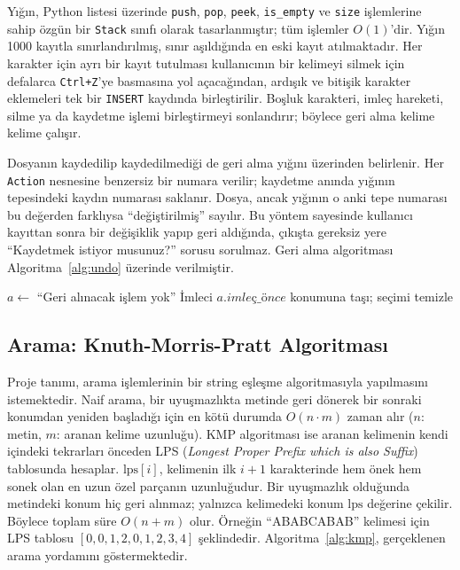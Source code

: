 \documentclass[conference,a4paper]{IEEEtran}
\newcommand{\kod}[1]{\texttt{#1}}
\begin{document}
Yığın, Python listesi üzerinde \kod{push}, \kod{pop}, \kod{peek}, \kod{is\_empty} ve \kod{size} işlemlerine sahip özgün bir \kod{Stack} sınıfı olarak tasarlanmıştır; tüm işlemler $O(1)$'dir. Yığın 1000 kayıtla sınırlandırılmış, sınır aşıldığında en eski kayıt atılmaktadır. Her karakter için ayrı bir kayıt tutulması kullanıcının bir kelimeyi silmek için defalarca \kod{Ctrl+Z}'ye basmasına yol açacağından, ardışık ve bitişik karakter eklemeleri tek bir \kod{INSERT} kaydında birleştirilir. Boşluk karakteri, imleç hareketi, silme ya da kaydetme işlemi birleştirmeyi sonlandırır; böylece geri alma kelime kelime çalışır.

Dosyanın kaydedilip kaydedilmediği de geri alma yığını üzerinden belirlenir. Her \kod{Action} nesnesine benzersiz bir numara verilir; kaydetme anında yığının tepesindeki kaydın numarası saklanır. Dosya, ancak yığının o anki tepe numarası bu değerden farklıysa ``değiştirilmiş'' sayılır. Bu yöntem sayesinde kullanıcı kayıttan sonra bir değişiklik yapıp geri aldığında, çıkışta gereksiz yere ``Kaydetmek istiyor musunuz?'' sorusu sorulmaz. Geri alma algoritması Algoritma~\ref{alg:undo} üzerinde verilmiştir.

\begin{algorithm}[t]
\caption{Geri Alma}
\label{alg:undo}
\begin{algorithmic}[1]
  \State $a \gets$ 
   \State \Return ``Geri alınacak işlem yok''
  \EndIf
  \State {}
  \State İmleci $a.\mathit{imleç\_önce}$ konumuna taşı; seçimi temizle
\EndProcedure
{}
    \State {}
    \State {}
  \Else {}
      \State {}
    \EndFor
  \EndIf
\EndProcedure
\end{algorithmic}
\end{algorithm}

\subsection{Arama: Knuth-Morris-Pratt Algoritması}

Proje tanımı, arama işlemlerinin bir string eşleşme algoritmasıyla yapılmasını istemektedir. Naif arama, bir uyuşmazlıkta metinde geri dönerek bir sonraki konumdan yeniden başladığı için en kötü durumda $O(n \cdot m)$ zaman alır ($n$: metin, $m$: aranan kelime uzunluğu). KMP algoritması \cite{kmp,clrs} ise aranan kelimenin kendi içindeki tekrarları önceden LPS (\textit{Longest Proper Prefix which is also Suffix}) tablosunda hesaplar. $\mathrm{lps}[i]$, kelimenin ilk $i+1$ karakterinde hem önek hem sonek olan en uzun özel parçanın uzunluğudur. Bir uyuşmazlık olduğunda metindeki konum hiç geri alınmaz; yalnızca kelimedeki konum $\mathrm{lps}$ değerine çekilir. Böylece toplam süre $O(n + m)$ olur. Örneğin ``ABABCABAB'' kelimesi için LPS tablosu $[0,0,1,2,0,1,2,3,4]$ şeklindedir. Algoritma~\ref{alg:kmp}, gerçeklenen arama yordamını göstermektedir.
\end{document}
